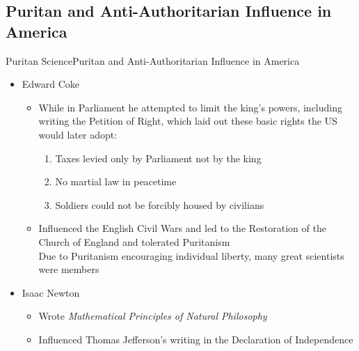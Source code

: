 \subsection{Puritan and Anti-Authoritarian Influence in America}
\begin{frame}{Puritan Science}{Puritan and Anti-Authoritarian Influence in America}
	\begin{itemize}
		\item Edward Coke
			\begin{itemize}
				\item While in Parliament he attempted to limit the king's powers, including writing the Petition of Right, which laid out these basic rights the US would later adopt:
				\begin{enumerate}
					\item Taxes levied only by Parliament not by the king
					\item No martial law in peacetime
					\item Soldiers could not be forcibly housed by civilians
				\end{enumerate}
				\item Influenced the English Civil Wars and led to the Restoration of the Church of England and tolerated Puritanism\\
					Due to Puritanism encouraging individual liberty, many great scientists were members
			\end{itemize}
		\item Isaac Newton
			\begin{itemize}
				\item Wrote \textit{Mathematical Principles of Natural Philosophy}
				\item Influenced Thomas Jefferson's writing in the Declaration of Independence
			\end{itemize}
	\end{itemize}
\end{frame}
